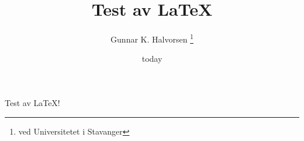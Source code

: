 \documentclass[12pt, letterpaper]{article}
\title{Test av \LaTeX{}}
\author{Gunnar K. Halvorsen \thanks{ved Universitetet i Stavanger}}
\date{today}
\begin{document}
\maketitle

Test av \LaTeX{}! 
\end{document}
